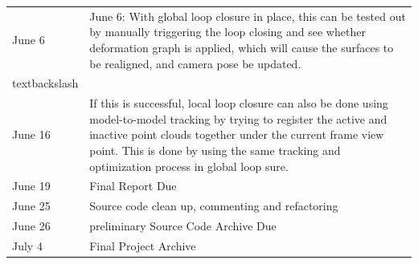 \documentclass[12pt,twoside]{article}
\begin{document}
\begin{table}[]
\begin{tabular}{ll}
June 6                      & June 6: With global loop closure in place, this can be tested out by manually triggering the loop closing and see whether deformation graph is applied, which will cause the surfaces to be realigned, and camera pose be updated.\\textbackslash                                                                                                                    \\
June 16                     & If this is successful, local loop closure can also be done using model-to-model tracking by trying to register the active and inactive point clouds together under the current frame view point. This is done by using the same tracking and optimization process in global loop sure.                                                                               \\
June 19                     & Final Report Due                                                                                                                                                                                                                                                                                                                                                     \\
June 25                     & Source code clean up, commenting and refactoring                                                                                                                                                                                                                                                                                                                     \\
June 26                     & preliminary Source Code Archive Due                                                                                                                                                                                                                                                                                                                                  \\
July 4                      & Final Project Archive                                                                                                                                                                                                                                                                                                                                                \\

\end{tabular}
\end{table}
\end{document}
